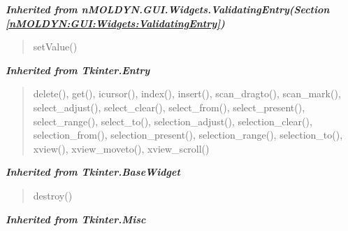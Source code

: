 \large{\textbf{\textit{Inherited from nMOLDYN.GUI.Widgets.ValidatingEntry\textit{(Section \ref{nMOLDYN:GUI:Widgets:ValidatingEntry})}}}}

\begin{quote}
setValue()
\end{quote}

\large{\textbf{\textit{Inherited from Tkinter.Entry}}}

\begin{quote}
delete(), get(), icursor(), index(), insert(), scan\_dragto(), scan\_mark(), select\_adjust(), select\_clear(), select\_from(), select\_present(), select\_range(), select\_to(), selection\_adjust(), selection\_clear(), selection\_from(), selection\_present(), selection\_range(), selection\_to(), xview(), xview\_moveto(), xview\_scroll()
\end{quote}

\large{\textbf{\textit{Inherited from Tkinter.BaseWidget}}}

\begin{quote}
destroy()
\end{quote}

\large{\textbf{\textit{Inherited from Tkinter.Misc}}}

